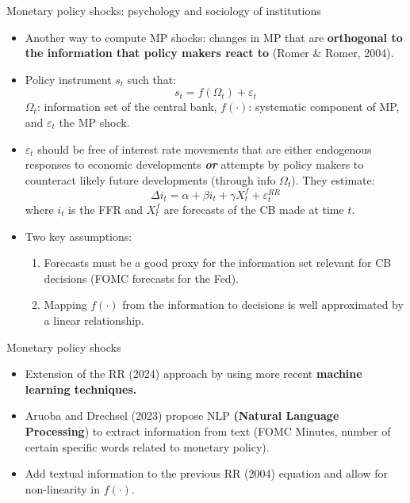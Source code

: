 \documentclass{beamer}
\begin{document}
\begin{frame}{Monetary policy shocks: psychology and sociology of institutions}
\footnotesize

\begin{itemize}

\item Another way to compute MP shocks: changes in MP that are \textbf{orthogonal to the information that policy makers react to} (Romer \& Romer, 2004).

\item Policy instrument $s_t$ such that:
\[
s_t = f(\Omega_t) + \varepsilon_t
\]
$\Omega_t$: information set of the central bank, 
$f(\cdot)$: systematic component of MP, and $\varepsilon_t$ the MP shock.

\item $\varepsilon_t$ should be free of interest rate movements that are 
either endogenous responses to economic developments \textit{\textbf{or}} attempts 
by policy makers to counteract likely future developments (through info $\Omega_t$). They estimate:
\[
\Delta i_t = \alpha + \beta i_t + \gamma X_t^{f} + \varepsilon_t^{RR}
\]
where $i_t$ is the FFR and $X_t^{f}$ are forecasts of the CB made at time $t$.

\item Two key assumptions:
  \begin{enumerate}
  \footnotesize
  \item Forecasts must be a good proxy for the information set relevant
        for CB decisions (FOMC forecasts for the Fed).
  \item Mapping $f(\cdot)$ from the information to decisions is well
        approximated by a linear relationship.
  \end{enumerate}

\end{itemize}

\end{frame}





\begin{frame}{Monetary policy shocks}


\begin{itemize}

\item Extension of the RR (2024) approach by using more recent \textbf{machine learning techniques.}

\item Aruoba and Drechsel (2023) propose NLP \textbf{(Natural Language Processing}) to extract 
information from text (FOMC Minutes, number of certain specific words related to monetary policy).

\item Add textual information to the previous RR (2004) equation 
and allow for non-linearity in $f(\cdot)$.

\end{itemize}

\end{frame}
\end{document}
